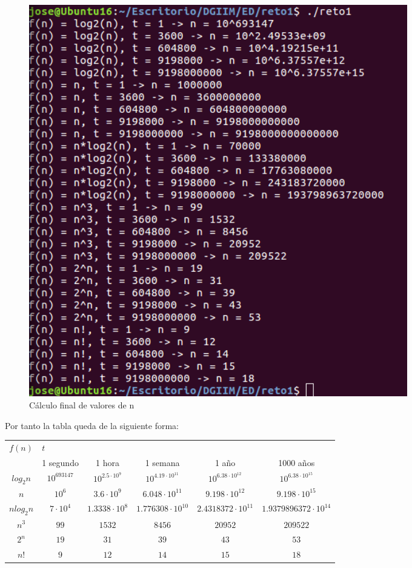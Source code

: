 \documentclass[11pt,a4paper]{article}
\begin{document}
\begin{enumerate}
\begin{figure}[H]
	\centering
	\includegraphics[width=0.8\textwidth]{Ejecucion.png}
	\caption{Cálculo final de valores de n}
\end{figure}

Por tanto la tabla queda de la siguiente forma:

\begin{table}[!htbp]
\centering
\label{Tabla}
\begin{tabular}{|c|c|c|c|c|c|}
\hline
 \multirow{2}{*}{$f(n)$}& \multicolumn{5}{l|}{\hfil$t$} \\ \cline{2-6} 
 &  1 segundo  & 1 hora   & 1 semana   &  1 año  & 1000 años  \\ \hline
 $log_2n$ &  $10^{693147}$  &  $10^{2.5 \cdot 10^9}$  &  $10^{4.19 \cdot 10^{11}}$  &  $10^{6.38 \cdot 10^{12}}$  &  $10^{6.38 \cdot 10^{15}}$ \\ \hline
 $n$&  $10^6$  &  $3.6 \cdot 10^9 $  &  $6.048 \cdot 10^{11}$  &  $9.198 \cdot 10^{12}$  & $9.198 \cdot 10^{15}$  \\ \hline
 $nlog_2n$&  $7 \cdot 10^4$  &  $1.3338 \cdot 10^8$  &  $1.776308\cdot 10^{10}$  &  $2.4318372 \cdot 10^{11}$  &  $1. 9379896372\cdot 10^{14}$ \\ \hline
 $n^3$&  $99$  &  $1532$  &  $8456$  &  $20952$  & $209522$  \\ \hline
 $2^n$&  $19$  &  $31$  & $39$   &  $43$  & $53$  \\ \hline
 $n!$&  $9$  &  $12$  &  $14$  &  $15$  &  $18$ \\ \hline
\end{tabular}
\end{table}

\end{enumerate}
\end{document}
